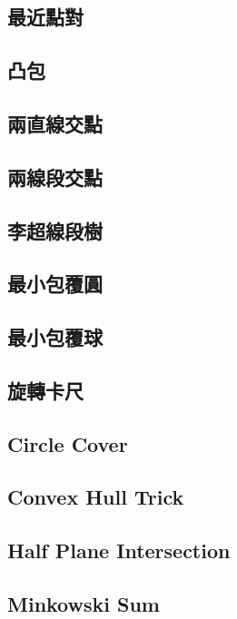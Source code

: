 \documentclass[a4paper,10pt,twocolumn,oneside]{article}
\begin{document}
\subsection{最近點對}

\subsection{凸包}

\subsection{兩直線交點}

\subsection{兩線段交點}

\subsection{李超線段樹}

\subsection{最小包覆圓}

\subsection{最小包覆球}

\subsection{旋轉卡尺}

\subsection{Circle Cover }

\subsection{Convex Hull Trick}

\subsection{Half Plane Intersection}

\subsection{Minkowski Sum}

\end{document}
